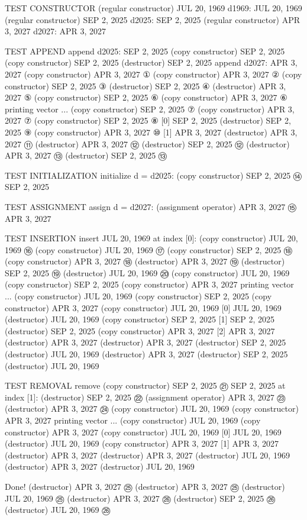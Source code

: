 \begin{codebox}
TEST CONSTRUCTOR
(regular constructor) JUL 20, 1969
d1969: JUL 20, 1969
(regular constructor) SEP 2, 2025
d2025: SEP 2, 2025
(regular constructor) APR 3, 2027
d2027: APR 3, 2027

TEST APPEND
append d2025: SEP 2, 2025
(copy constructor) SEP 2, 2025
(copy constructor) SEP 2, 2025
(destructor) SEP 2, 2025
append d2027: APR 3, 2027
(copy constructor) APR 3, 2027         ①
(copy constructor) APR 3, 2027         ②
(copy constructor) SEP 2, 2025         ③
(destructor) SEP 2, 2025               ④
(destructor) APR 3, 2027               ⑤
(copy constructor) SEP 2, 2025         ⑥
(copy constructor) APR 3, 2027         ⑥
printing vector ...
(copy constructor) SEP 2, 2025         ⑦
(copy constructor) APR 3, 2027         ⑦
(copy constructor) SEP 2, 2025         ⑧
[0] SEP 2, 2025
(destructor) SEP 2, 2025               ⑨
(copy constructor) APR 3, 2027         ⑩
[1] APR 3, 2027
(destructor) APR 3, 2027               ⑪
(destructor) APR 3, 2027               ⑫
(destructor) SEP 2, 2025               ⑫
(destructor) APR 3, 2027               ⑬
(destructor) SEP 2, 2025               ⑬

TEST INITIALIZATION
initialize d = d2025:
(copy constructor) SEP 2, 2025         ⑭
SEP 2, 2025

TEST ASSIGNMENT
assign d = d2027:
(assignment operator) APR 3, 2027      ⑮
APR 3, 2027

TEST INSERTION
insert JUL 20, 1969 at index [0]:
(copy constructor) JUL 20, 1969        ⑯
(copy constructor) JUL 20, 1969        ⑰
(copy constructor) SEP 2, 2025         ⑱
(copy constructor) APR 3, 2027         ⑱
(destructor) APR 3, 2027               ⑲
(destructor) SEP 2, 2025               ⑲
(destructor) JUL 20, 1969              ⑳
(copy constructor) JUL 20, 1969
(copy constructor) SEP 2, 2025
(copy constructor) APR 3, 2027
printing vector ...
(copy constructor) JUL 20, 1969
(copy constructor) SEP 2, 2025
(copy constructor) APR 3, 2027
(copy constructor) JUL 20, 1969
[0] JUL 20, 1969
(destructor) JUL 20, 1969
(copy constructor) SEP 2, 2025
[1] SEP 2, 2025
(destructor) SEP 2, 2025
(copy constructor) APR 3, 2027
[2] APR 3, 2027
(destructor) APR 3, 2027
(destructor) APR 3, 2027
(destructor) SEP 2, 2025
(destructor) JUL 20, 1969
(destructor) APR 3, 2027
(destructor) SEP 2, 2025
(destructor) JUL 20, 1969

TEST REMOVAL
remove (copy constructor) SEP 2, 2025  ㉑
SEP 2, 2025 at index [1]:
(destructor) SEP 2, 2025               ㉒
(assignment operator) APR 3, 2027      ㉓
(destructor) APR 3, 2027               ㉔
(copy constructor) JUL 20, 1969
(copy constructor) APR 3, 2027
printing vector ...
(copy constructor) JUL 20, 1969
(copy constructor) APR 3, 2027
(copy constructor) JUL 20, 1969
[0] JUL 20, 1969
(destructor) JUL 20, 1969
(copy constructor) APR 3, 2027
[1] APR 3, 2027
(destructor) APR 3, 2027
(destructor) APR 3, 2027
(destructor) JUL 20, 1969
(destructor) APR 3, 2027
(destructor) JUL 20, 1969

Done!
(destructor) APR 3, 2027               ㉕
(destructor) APR 3, 2027               ㉕
(destructor) JUL 20, 1969              ㉕
(destructor) APR 3, 2027               ㉖
(destructor) SEP 2, 2025               ㉖
(destructor) JUL 20, 1969              ㉖
\end{codebox}

